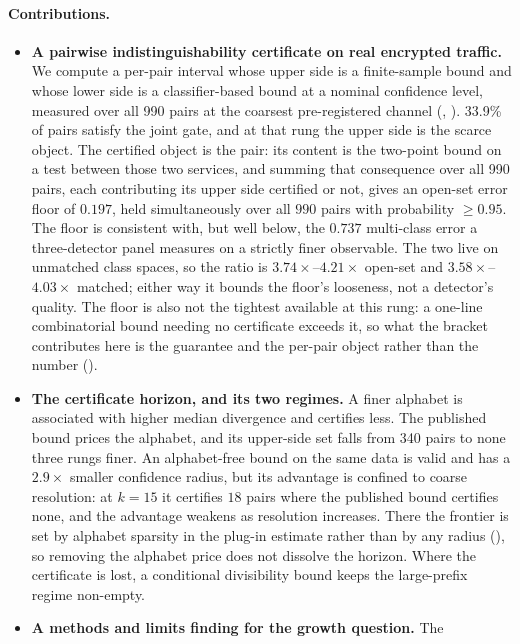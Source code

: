 \paragraph{Contributions.}
\begin{itemize}
  \item \textbf{A pairwise indistinguishability certificate on real encrypted
  traffic.} We compute a per-pair interval whose upper side is a finite-sample
  bound and whose lower side is a classifier-based bound at a nominal confidence
  level, measured over all 990 pairs at the coarsest pre-registered channel
  (, ). 33.9\% of pairs satisfy the
  joint gate, and at that rung the upper side is the scarce object. The
  certified object is the pair: its content is the two-point bound on a test
  between those two services, and summing that consequence over all 990 pairs,
  each contributing its upper side certified or not, gives an open-set error
  floor of
  $0.197$, held simultaneously over all $990$ pairs with probability $\ge 0.95$.
  The floor is consistent with, but well below, the $0.737$
  multi-class error a three-detector panel measures on a strictly finer
  observable. The two live on unmatched class spaces, so the ratio is
  $3.74\times$--$4.21\times$ open-set and $3.58\times$--$4.03\times$ matched;
  either way it bounds the floor's looseness, not a detector's quality. The
  floor is also not the tightest available at this rung: a one-line combinatorial
  bound needing no certificate exceeds it, so what the bracket contributes here
  is the guarantee and the per-pair object rather than the number
  ().
  \item \textbf{The certificate horizon, and its two regimes.}
  A finer alphabet is associated with higher median divergence and certifies
  less. The published bound prices the alphabet, and its upper-side set falls
  from 340 pairs to none three rungs finer. An alphabet-free bound on the same
  data is valid and has a $2.9\times$ smaller confidence radius, but its
  advantage is confined to coarse resolution: at $k{=}15$ it certifies $18$ pairs where the published bound
  certifies none, and the advantage weakens as resolution increases. There the
  frontier is set by alphabet sparsity in the plug-in estimate rather than by any radius
  (), so removing the alphabet price does not dissolve
  the horizon. Where the certificate is lost, a conditional divisibility bound
  keeps the large-prefix regime non-empty.
  \item \textbf{A methods and limits finding for the growth question.} The

\end{itemize}

